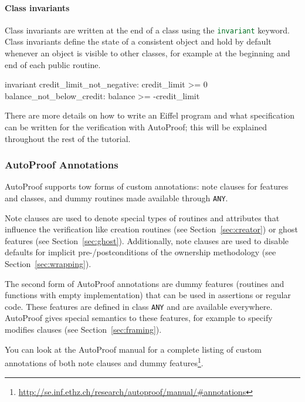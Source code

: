 \documentclass[a4paper,12pt]{article}
\newcommand{\AutoProof}{Auto\-Proof\xspace}
\newcommand{\e}[1]{\mbox{\lstinline[language=Eiffel]|#1|}}
\begin{document}
\paragraph{Class invariants}

Class invariants are written at the end of a class using the \e{invariant} keyword. Class invariants define the state of a consistent object and hold by default whenever an object is visible to other classes, for example at the beginning and end of each public routine.

\begin{erunning}
invariant
	credit_limit_not_negative: credit_limit >= 0
	balance_not_below_credit: balance >= -credit_limit
\end{erunning}

There are more details on how to write an Eiffel program and what specification can be written for the verification with \AutoProof; this will be explained throughout the rest of the tutorial.

\subsubsection*{\AutoProof Annotations}

\AutoProof supports tow forms of custom annotations: note clauses for features and classes, and dummy routines made available through \e{ANY}.

Note clauses are used to denote special types of routines and attributes that influence the verification like creation routines (see Section~\ref{sec:creator}) or ghost features (see Section~\ref{sec:ghost}). Additionally, note clauses are used to disable defaults for implicit pre-/postconditions of the ownership methodology (see Section~\ref{sec:wrapping}). %

The second form of \AutoProof annotations are dummy features (routines and functions with empty implementation) that can be used in assertions or regular code. These features are defined in class \e{ANY} and are available everywhere. \AutoProof gives special semantics to these features, for example to specify modifies clauses (see Section~\ref{sec:framing}).

You can look at the \AutoProof manual for a complete listing of custom annotations of both note clauses and dummy features\footnote{\url{http://se.inf.ethz.ch/research/autoproof/manual/\#annotations}}.
\end{document}
